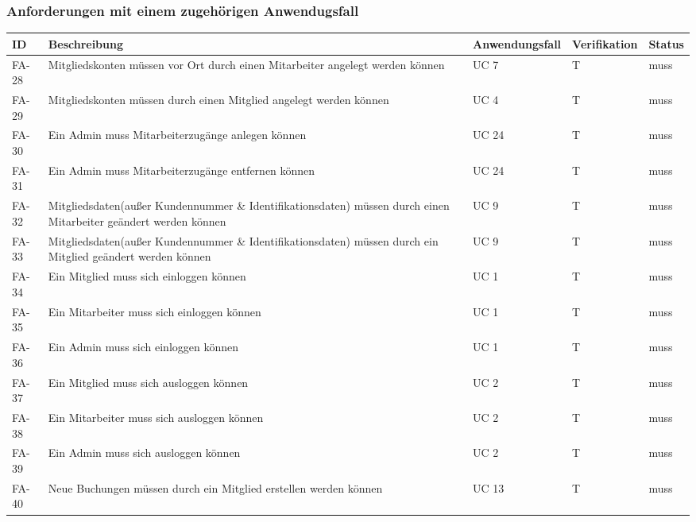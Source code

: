 \subsubsection{Anforderungen mit einem zugehörigen Anwendugsfall}
    \begin{longtable}{|m{1.5cm}|m{5.5cm}|P{3cm}|P{2cm}|P{1cm}|}
        \hline
        \textbf{ID}     & \textbf{Beschreibung} & \textbf{Anwendungsfall} & \textbf{Verifikation} & \textbf{Status} \\
        \hline
        FA-28           & Mitgliedskonten müssen vor Ort durch einen Mitarbeiter angelegt werden können & UC 7 & T & muss\\
        \hline
        FA-29        & Mitgliedskonten müssen durch einen Mitglied angelegt werden können & UC 4 & T & muss\\
        \hline
        FA-30           & Ein Admin muss Mitarbeiterzugänge anlegen können & UC 24 & T & muss\\
        \hline
        FA-31           & Ein Admin muss Mitarbeiterzugänge entfernen können & UC 24 & T & muss\\
        \hline
        FA-32           & Mitgliedsdaten(außer Kundennummer \& Identifikationsdaten) müssen durch einen Mitarbeiter geändert werden können & UC 9 & T & muss\\
        \hline
        FA-33           & Mitgliedsdaten(außer Kundennummer \& Identifikationsdaten) müssen durch ein Mitglied geändert werden können & UC 9 & T & muss\\
        \hline
        FA-34           & Ein Mitglied muss sich einloggen können & UC 1 & T & muss \\
        \hline
        FA-35           & Ein Mitarbeiter muss sich einloggen können & UC 1 & T & muss \\
        \hline
        FA-36           & Ein Admin muss sich einloggen können & UC 1 & T & muss \\
        \hline
        FA-37           & Ein Mitglied muss sich ausloggen können & UC 2 & T & muss \\
        \hline
        FA-38           & Ein Mitarbeiter muss sich ausloggen können & UC 2 & T & muss \\
        \hline
        FA-39           & Ein Admin muss sich ausloggen können & UC 2 & T & muss \\
        \hline
        FA-40           & Neue Buchungen müssen durch ein Mitglied erstellen werden können & UC 13 & T & muss \\
        \hline

\end{longtable}
